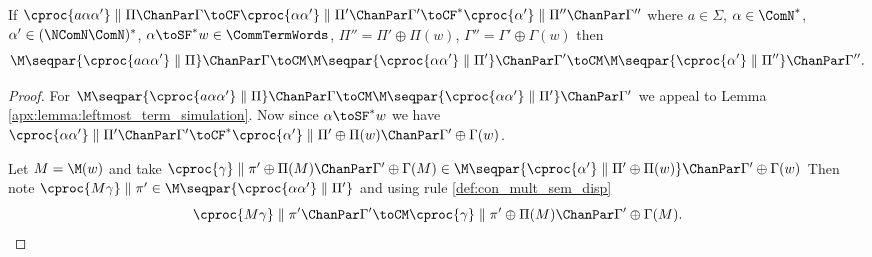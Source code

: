 \begin{lemma}\label{apx:lemma:term_sideeffect_pop}
If 
$\cproc{a\alpha\alpha'} \parallel \Pi \ChanPar \Gamma \toCF 
	\cproc{\alpha\alpha'} \parallel \Pi' \ChanPar \Gamma' \toCF^* 
	\cproc{\alpha'} \parallel \Pi'' \ChanPar \Gamma''$ 
where ${a \in \Sigma}$, 
	  $\alpha \in \ComN^*$, 
	  $\alpha' \in (\NComN \ComN)^*$, 
	  ${\alpha \toSF^* w \in \CommTermWords}$, 
	  $\Pi'' = \Pi' \oplus \Pi(w)$, 
	  $\Gamma'' = \Gamma' \oplus \Gamma(w)$
then 
$$\M\seqpar{\cproc{a\alpha\alpha'} \parallel \Pi} \ChanPar \Gamma \toCM \M\seqpar{\cproc{\alpha\alpha'} \parallel \Pi'} \ChanPar \Gamma' \toCM \M\seqpar{\cproc{\alpha'} \parallel \Pi''} \ChanPar \Gamma''.$$
\end{lemma}
\begin{proof}
For
 $\M\seqpar{\cproc{a\alpha\alpha'} \parallel \Pi} \ChanPar \Gamma \toCM 
  \M\seqpar{\cproc{\alpha\alpha'} \parallel \Pi'} \ChanPar \Gamma' $
we appeal to Lemma \ref{apx:lemma:leftmost_term_simulation}.
Now since $\alpha \toSF^* w$ we have 
$\cproc{\alpha\alpha'} \parallel \Pi' \ChanPar \Gamma' \toCF^* 
 \cproc{\alpha'} \parallel \Pi' \oplus \Pi(w) \ChanPar \Gamma' \oplus \Gamma(w)$.

Let $M = \M(w)$ and
take $\cproc{\gamma} \parallel \pi' \oplus \Pi(M) \ChanPar \Gamma' \oplus \Gamma(M) \in 
{\M\seqpar{\cproc{\alpha'} \parallel \Pi' \oplus \Pi(w)} \ChanPar \Gamma' \oplus \Gamma(w)}$
Then note
$\cproc{M\gamma} \parallel \pi' \in \M\seqpar{\cproc{\alpha\alpha'} \parallel \Pi'}$ 
and using rule \ref{def:con_mult_sem_disp}
$$\cproc{M\gamma} \parallel \pi' \ChanPar \Gamma' \toCM \cproc{\gamma} \parallel \pi' \oplus \Pi(M) \ChanPar \Gamma' \oplus \Gamma(M).$$
\end{proof}


